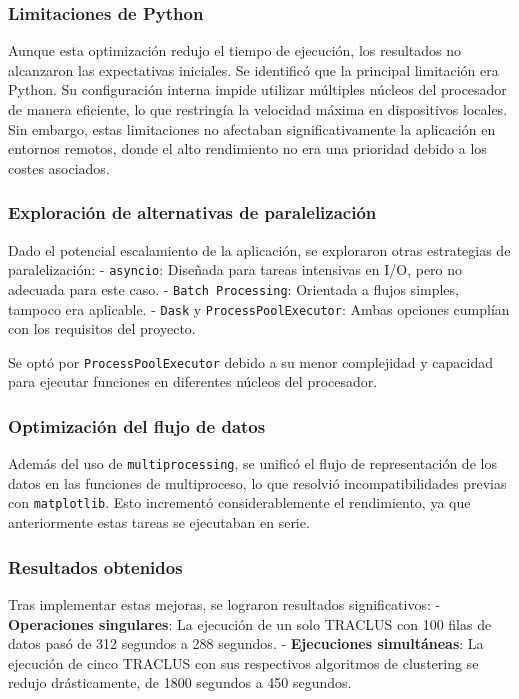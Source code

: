 \subsubsection{Limitaciones de Python}
Aunque esta optimización redujo el tiempo de ejecución, los resultados no alcanzaron las expectativas iniciales. Se identificó que la principal limitación era Python. Su configuración interna impide utilizar múltiples núcleos del procesador de manera eficiente, lo que restringía la velocidad máxima en dispositivos locales. Sin embargo, estas limitaciones no afectaban significativamente la aplicación en entornos remotos, donde el alto rendimiento no era una prioridad debido a los costes asociados.

\subsubsection{Exploración de alternativas de paralelización}
Dado el potencial escalamiento de la aplicación, se exploraron otras estrategias de paralelización:
- \texttt{asyncio}: Diseñada para tareas intensivas en I/O, pero no adecuada para este caso.
- \texttt{Batch Processing}: Orientada a flujos simples, tampoco era aplicable.
- \texttt{Dask} y \texttt{ProcessPoolExecutor}: Ambas opciones cumplían con los requisitos del proyecto.

Se optó por \texttt{ProcessPoolExecutor} debido a su menor complejidad y capacidad para ejecutar funciones en diferentes núcleos del procesador.

\subsubsection{Optimización del flujo de datos}
Además del uso de \texttt{multiprocessing}, se unificó el flujo de representación de los datos en las funciones de multiproceso, lo que resolvió incompatibilidades previas con \texttt{matplotlib}. Esto incrementó considerablemente el rendimiento, ya que anteriormente estas tareas se ejecutaban en serie.

\subsubsection{Resultados obtenidos}
Tras implementar estas mejoras, se lograron resultados significativos:
- \textbf{Operaciones singulares}: La ejecución de un solo TRACLUS con 100 filas de datos pasó de 312 segundos a 288 segundos.
- \textbf{Ejecuciones simultáneas}: La ejecución de cinco TRACLUS con sus respectivos algoritmos de clustering se redujo drásticamente, de 1800 segundos a 450 segundos.

